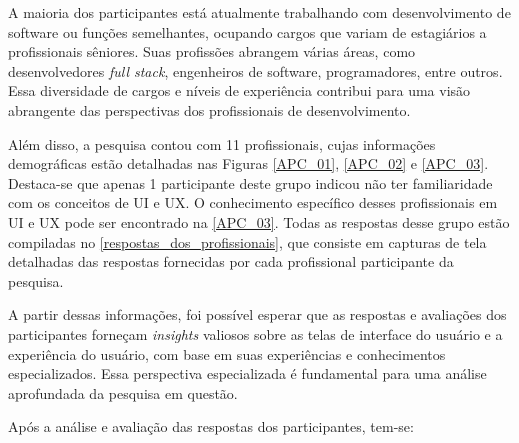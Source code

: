 A maioria dos participantes está atualmente trabalhando com desenvolvimento de software ou funções semelhantes, ocupando cargos que variam de estagiários a profissionais sêniores. Suas profissões abrangem várias áreas, como desenvolvedores \textit{full stack}, engenheiros de software, programadores, entre outros. Essa diversidade de cargos e níveis de experiência contribui para uma visão abrangente das perspectivas dos profissionais de desenvolvimento.

Além disso, a pesquisa contou com 11 profissionais, cujas informações demográficas estão detalhadas nas Figuras \ref{APC_01}, \ref{APC_02} e \ref{APC_03}. Destaca-se que apenas 1 participante deste grupo indicou não ter familiaridade com os conceitos de \ac{UI} e \ac{UX}. O conhecimento específico desses profissionais em \ac{UI} e \ac{UX} pode ser encontrado na \autoref{APC_03}. Todas as respostas desse grupo estão compiladas no \autoref{respostas_dos_profissionais}, que consiste em capturas de tela detalhadas das respostas fornecidas por cada profissional participante da pesquisa.

A partir dessas informações, foi possível esperar que as respostas e avaliações dos participantes forneçam \textit{insights} valiosos sobre as telas de interface do usuário e a experiência do usuário, com base em suas experiências e conhecimentos especializados. Essa perspectiva especializada é fundamental para uma análise aprofundada da pesquisa em questão. 

Após a análise e avaliação das respostas dos participantes, tem-se: 

